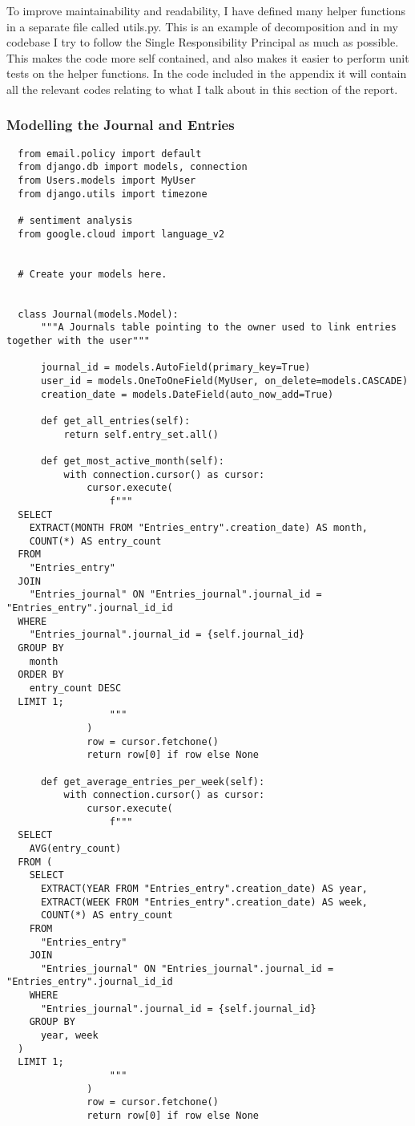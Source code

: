 To improve maintainability and readability, I have defined many helper functions in a separate file called utils.py. This is an example of decomposition and in my codebase I try to follow the Single Responsibility Principal as much as possible. This makes the code more self contained, and also makes it easier to perform unit tests on the helper functions. In the code included in the appendix it will contain all the relevant codes relating to what I talk about in this section of the report.


\subsubsection{Modelling the Journal and Entries}
\begin{verbatim}
  from email.policy import default
  from django.db import models, connection
  from Users.models import MyUser
  from django.utils import timezone
  
  # sentiment analysis
  from google.cloud import language_v2
  
  
  # Create your models here.
  
  
  class Journal(models.Model):
      """A Journals table pointing to the owner used to link entries together with the user"""
  
      journal_id = models.AutoField(primary_key=True)
      user_id = models.OneToOneField(MyUser, on_delete=models.CASCADE)
      creation_date = models.DateField(auto_now_add=True)
  
      def get_all_entries(self):
          return self.entry_set.all()
  
      def get_most_active_month(self):
          with connection.cursor() as cursor:
              cursor.execute(
                  f"""
  SELECT
    EXTRACT(MONTH FROM "Entries_entry".creation_date) AS month,
    COUNT(*) AS entry_count
  FROM
    "Entries_entry"
  JOIN
    "Entries_journal" ON "Entries_journal".journal_id = "Entries_entry".journal_id_id
  WHERE
    "Entries_journal".journal_id = {self.journal_id}
  GROUP BY
    month
  ORDER BY
    entry_count DESC
  LIMIT 1;
                  """
              )
              row = cursor.fetchone()
              return row[0] if row else None
  
      def get_average_entries_per_week(self):
          with connection.cursor() as cursor:
              cursor.execute(
                  f"""
  SELECT
    AVG(entry_count)
  FROM (
    SELECT
      EXTRACT(YEAR FROM "Entries_entry".creation_date) AS year,
      EXTRACT(WEEK FROM "Entries_entry".creation_date) AS week,
      COUNT(*) AS entry_count
    FROM
      "Entries_entry"
    JOIN
      "Entries_journal" ON "Entries_journal".journal_id = "Entries_entry".journal_id_id
    WHERE
      "Entries_journal".journal_id = {self.journal_id}
    GROUP BY
      year, week
  )
  LIMIT 1; 
                  """
              )
              row = cursor.fetchone()
              return row[0] if row else None
  

\end{verbatim}
